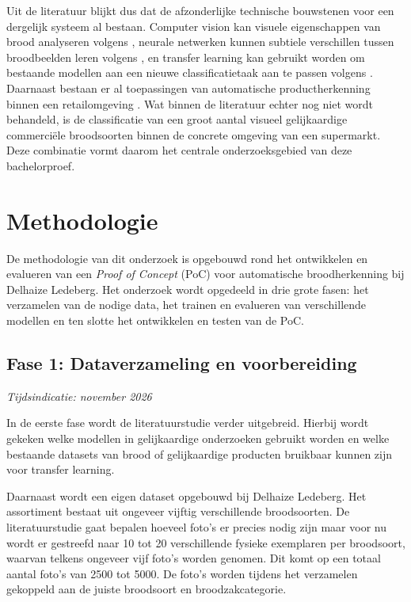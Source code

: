 Uit de literatuur blijkt dus dat de afzonderlijke technische bouwstenen voor een dergelijk systeem al bestaan. Computer vision kan visuele eigenschappen van brood analyseren volgens \autocite{Olakanmi2023}, neurale netwerken kunnen subtiele verschillen tussen broodbeelden leren volgens \autocite{Cotrim2020,Tantiphanwadi2022}, en transfer learning kan gebruikt worden om bestaande modellen aan een nieuwe classificatietaak aan te passen volgens \autocite{Zhuang_2021,Abou_Baker_2022}. Daarnaast bestaan er al toepassingen van automatische productherkenning binnen een retailomgeving \autocite{Ciapas_2023,ColruytGroup2019}. Wat binnen de literatuur echter nog niet wordt behandeld, is de classificatie van een groot aantal visueel gelijkaardige commerciële broodsoorten binnen de concrete omgeving van een supermarkt. Deze combinatie vormt daarom het centrale onderzoeksgebied van deze bachelorproef.




\section{Methodologie}
\label{sec:methodologie}

De methodologie van dit onderzoek is opgebouwd rond het ontwikkelen en evalueren van een \textit{Proof of Concept} (PoC) voor automatische broodherkenning bij Delhaize Ledeberg. Het onderzoek wordt opgedeeld in drie grote fasen: het verzamelen van de nodige data, het trainen en evalueren van verschillende modellen en ten slotte het ontwikkelen en testen van de PoC.

\subsection{Fase 1: Dataverzameling en voorbereiding}
\emph{Tijdsindicatie: november 2026}

In de eerste fase wordt de literatuurstudie verder uitgebreid. Hierbij wordt gekeken welke modellen in gelijkaardige onderzoeken gebruikt worden en welke bestaande datasets van brood of gelijkaardige producten bruikbaar kunnen zijn voor transfer learning.

Daarnaast wordt een eigen dataset opgebouwd bij Delhaize Ledeberg. Het assortiment bestaat uit ongeveer vijftig verschillende broodsoorten. De literatuurstudie gaat bepalen hoeveel foto's er precies nodig zijn maar voor nu wordt er gestreefd naar 10 tot 20 verschillende fysieke exemplaren per broodsoort, waarvan telkens ongeveer vijf foto's worden genomen. Dit komt op een totaal aantal foto's van 2500 tot 5000. De foto's worden tijdens het verzamelen gekoppeld aan de juiste broodsoort en broodzakcategorie.

